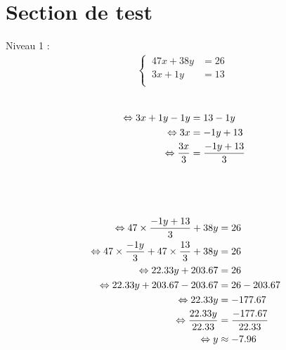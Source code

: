 \documentclass{article}%
\begin{document}
%
\normalsize%
\fontsize{12}{10}%
\selectfont%
\section*{Section de test}%
\label{sec:Sectiondetest}%
Niveau 1 :%
\begin{align*}%
\begin{cases}%
\  47x + 38y &= 26 \\%
\  3x + 1y &= 13 \\%
\end{cases}%
\\%
\end{align*}%
\ \\%
\vspace{5mm}%
\newline%
\begin{align*}%
\  \Leftrightarrow 3x + 1y - 1y &= 13 - 1y \\%
\vspace{5mm}%
\newline%
\  \Leftrightarrow 3x &= -1y + 13\\%
\vspace{5mm}%
\newline%
\  \Leftrightarrow \frac{3x}{3} &= \frac{-1y + 13}{3}\\%
\vspace{5mm}%
\newline%
\end{align*}%
\\%
\ \\%
\vspace{5mm}%
\newline%
\begin{align*}%
\ \Leftrightarrow  47 \times \frac{-1y + 13}{3} + 38y &= 26\\%
\vspace{5mm}%
\newline%
\ \Leftrightarrow  47 \times \frac{-1y}{3} + 47 \times \frac{13}{3} + 38y &= 26\\%
\vspace{5mm}%
\newline%
\ \Leftrightarrow  22.33y + 203.67 &= 26\\%
\vspace{5mm}%
\newline%
\ \Leftrightarrow  22.33y + 203.67 - 203.67 &= 26 - 203.67\\%
\vspace{5mm}%
\newline%
\ \Leftrightarrow  22.33y  &= -177.67\\%
\vspace{5mm}%
\newline%
\ \Leftrightarrow  \frac{22.33y}{22.33}  &= \frac{-177.67}{22.33}\\%
\vspace{5mm}%
\newline%
\ \Leftrightarrow  y  &\approx -7.96\\%
\vspace{5mm}%
\newline%
\end{align*}%
\end{document}
